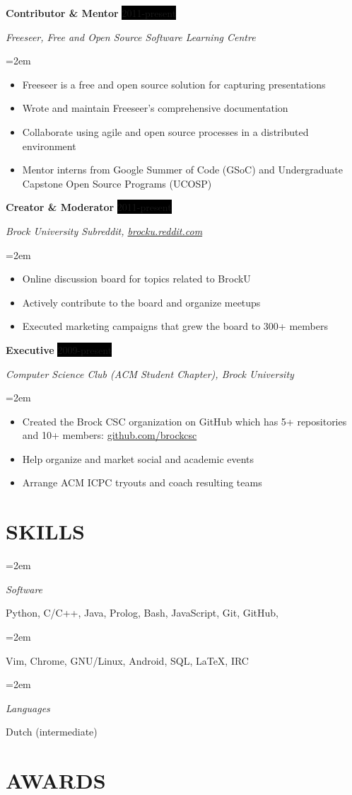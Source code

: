 \documentclass[paper=a4,fontsize=11pt]{scrartcl} %
\newlength{\spacebox}
\newcommand{\sepspace}{\vspace*{1em}}		%
\newcommand{\NewPart}[1]{\section*{\uppercase{#1}}}
\newcommand{\PersonalEntry}[2]{
		\noindent\hangindent=2em\hangafter=0 %
		\parbox{\spacebox}{        %
		\textit{#1}}		       %
		\hspace{1.5em} #2 \par}    %
\newcommand{\SkillsEntry}[2]{      %
		\noindent\hangindent=2em\hangafter=0 %
		\parbox{\spacebox}{        %
		\textit{#1}}			   %
		\hspace{1.5em} #2 \par}    %
\newcommand{\EducationEntry}[4]{
		\noindent \textbf{#1} \hfill      %
		\colorbox{Black}{%
			\parbox{8.0em}{%
			\hfill\color{White}#2}} \par  %
		\noindent \textit{#3} \par        %
		\noindent\hangindent=2em\hangafter=0 \small #4 %
		\normalsize \par}
\newcommand{\OrganizationEntry}[4]{		  %
		\noindent \textbf{#1} \hfill      %
		\colorbox{Black}{\color{White}#2} \par  %
		\noindent \textit{#3} \par              %
		\noindent\hangindent=2em\hangafter=0 \small #4 %
		\normalsize \par}
\begin{document}
\OrganizationEntry{Contributor \& Mentor}{2011-present}
{Freeseer, Free and Open Source Software Learning Centre}
{
 \begin{itemize} \itemsep -1pt %
   \item Freeseer is a free and open source solution for capturing presentations
   \item Wrote and maintain Freeseer's comprehensive documentation
   \item Collaborate using agile and open source processes in a distributed environment
   \item Mentor interns from Google Summer of Code (GSoC) and Undergraduate Capstone Open Source Programs (UCOSP)
 \end{itemize}
}
\sepspace

\OrganizationEntry{Creator \& Moderator}{2011-present}
{Brock University Subreddit, \url{brocku.reddit.com}}
{
 \begin{itemize} \itemsep -1pt
   \item Online discussion board for topics related to BrockU
   \item Actively contribute to the board and organize meetups
   \item Executed marketing campaigns that grew the board to 300+ members
 \end{itemize}
}
\sepspace

\OrganizationEntry{Executive}{2009-present}
{Computer Science Club (ACM Student Chapter), Brock University}
{
 \begin{itemize} \itemsep -1pt
   \item Created the Brock CSC organization on GitHub which has 5+ repositories and 10+ members:
\url{github.com/brockcsc}
   \item Help organize and market social and academic events
   \item Arrange ACM ICPC tryouts and coach resulting teams
 \end{itemize}
}

\NewPart{Skills}{}

\SkillsEntry{Software}{Python, \textsc{C/C++}, Java, Prolog, Bash,
JavaScript, Git, GitHub,}
\SkillsEntry{}{Vim, Chrome, GNU/Linux, Android, SQL, \LaTeX, IRC}
\sepspace
\SkillsEntry{Languages}{Dutch (intermediate)}

\NewPart{Awards}{}
\end{document}
